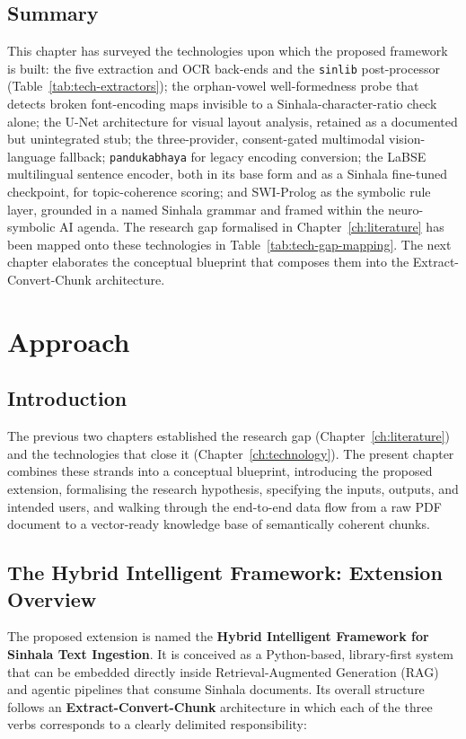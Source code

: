 \documentclass[12pt,a4paper,oneside]{report}
\begin{document}
\section{Summary}
\label{sec:ch3-summary}
This chapter has surveyed the technologies upon which the proposed framework is built: the five extraction and OCR back-ends and the \texttt{sinlib} post-processor (Table~\ref{tab:tech-extractors}); the orphan-vowel well-formedness probe that detects broken font-encoding maps invisible to a Sinhala-character-ratio check alone; the U-Net architecture for visual layout analysis, retained as a documented but unintegrated stub; the three-provider, consent-gated multimodal vision-language fallback; \texttt{pandukabhaya} for legacy encoding conversion; the LaBSE multilingual sentence encoder, both in its base form and as a Sinhala fine-tuned checkpoint, for topic-coherence scoring; and SWI-Prolog as the symbolic rule layer, grounded in a named Sinhala grammar and framed within the neuro-symbolic AI agenda. The research gap formalised in Chapter~\ref{ch:literature} has been mapped onto these technologies in Table~\ref{tab:tech-gap-mapping}. The next chapter elaborates the conceptual blueprint that composes them into the Extract-Convert-Chunk architecture.

\chapter{Approach}
\label{ch:approach}

\section{Introduction}
The previous two chapters established the research gap (Chapter~\ref{ch:literature}) and the technologies that close it (Chapter~\ref{ch:technology}). The present chapter combines these strands into a conceptual blueprint, introducing the proposed extension, formalising the research hypothesis, specifying the inputs, outputs, and intended users, and walking through the end-to-end data flow from a raw PDF document to a vector-ready knowledge base of semantically coherent chunks.

\section{The Hybrid Intelligent Framework: Extension Overview}
\label{sec:approach-overview}
The proposed extension is named the \textbf{Hybrid Intelligent Framework for Sinhala Text Ingestion}. It is conceived as a Python-based, library-first system that can be embedded directly inside Retrieval-Augmented Generation (RAG) and agentic pipelines that consume Sinhala documents. Its overall structure follows an \textbf{Extract-Convert-Chunk} architecture in which each of the three verbs corresponds to a clearly delimited responsibility:
\end{document}
